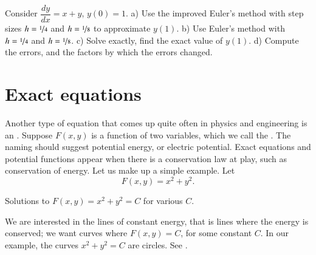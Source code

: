 \documentclass[12pt]{book}
\begin{document}
\begin{exercise}
Consider $\dfrac{dy}{dx} = x+y$, $y(0)=1$.
a) Use the improved Euler's method with step sizes $h=\nicefrac{1}{4}$ and $h=\nicefrac{1}{8}$
to approximate $y(1)$.  b) Use Euler's method with
$h=\nicefrac{1}{4}$ and $h=\nicefrac{1}{8}$.  c) Solve exactly, find the exact value of
$y(1)$.  d) Compute the errors, and the factors by which the errors changed.
\end{exercise}


\sectionnewpage
\section{Exact equations} \label{exact:section}


Another type of equation that comes up quite often in physics and
engineering is an
\emph{}.
Suppose $F(x,y)$ is a function of two variables, which we call the
\emph{}.  The naming should suggest 
potential energy, or electric potential.  Exact equations and potential
functions appear when there is a conservation law at play, such as 
conservation of energy.
Let us make up a simple example.  Let
\begin{equation*}
F(x,y) = x^2+y^2 .
\end{equation*}

\begin{diffyfloatingfigurepdfonly}{3.1in}
\capstart
\begin{center}
\diffypdfversion{\vspace*{-0.4cm}}
\caption{Solutions to $F(x,y) = x^2+y^2 = C$ for various
$C$.\label{exact:circlesfig}}
\diffypdfversion{\vspace*{0.4cm}}
\end{center}
\end{diffyfloatingfigurepdfonly}
We are interested in the lines of constant energy, that is lines where
the energy is conserved;  we want curves where $F(x,y) = C$, for some constant $C$.  In
our example, the curves $x^2+y^2=C$ are circles.  See
.
\end{document}
